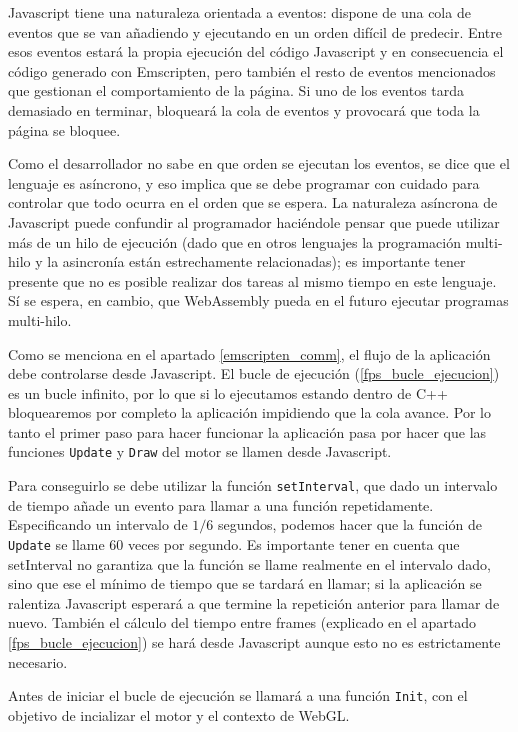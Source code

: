 Javascript tiene una naturaleza orientada a eventos: dispone de una cola de eventos que se van añadiendo y ejecutando en un orden difícil de predecir. Entre esos eventos estará la propia ejecución del código Javascript y en consecuencia el código generado con Emscripten, pero también el resto de eventos mencionados que gestionan el comportamiento de la página. Si uno de los eventos tarda demasiado en terminar, bloqueará la cola de eventos y provocará que toda la página se bloquee.

Como el desarrollador no sabe en que orden se ejecutan los eventos, se dice que el lenguaje es asíncrono, y eso implica que se debe programar con cuidado para controlar que todo ocurra en el orden que se espera. La naturaleza asíncrona de Javascript puede confundir al programador haciéndole pensar que puede utilizar más de un hilo de ejecución (dado que en otros lenguajes la programación multi-hilo y la asincronía están estrechamente relacionadas); es importante tener presente que no es posible realizar dos tareas al mismo tiempo en este lenguaje. Sí se espera, en cambio, que WebAssembly pueda en el futuro ejecutar programas multi-hilo.

Como se menciona en el apartado \ref{emscripten_comm}, el flujo de la aplicación debe controlarse desde Javascript. El bucle de ejecución (\ref{fps_bucle_ejecucion}) es un bucle infinito, por lo que si lo ejecutamos estando dentro de C++ bloquearemos por completo la aplicación impidiendo que la cola avance. Por lo tanto el primer paso para hacer funcionar la aplicación pasa por hacer que las funciones \texttt{Update} y \texttt{Draw} del motor se llamen desde Javascript.

Para conseguirlo se debe utilizar la función \texttt{setInterval}, que dado un intervalo de tiempo añade un evento para llamar a una función repetidamente. Especificando un intervalo de $1/6$ segundos, podemos hacer que la función de \texttt{Update} se llame 60 veces por segundo. Es importante tener en cuenta que setInterval no garantiza que la función se llame realmente en el intervalo dado, sino que ese el mínimo de tiempo que se tardará en llamar; si la aplicación se ralentiza Javascript esperará a que termine la repetición anterior para llamar de nuevo. También el cálculo del tiempo entre frames (explicado en el apartado \ref{fps_bucle_ejecucion}) se hará desde Javascript aunque esto no es estrictamente necesario.

Antes de iniciar el bucle de ejecución se llamará a una función \texttt{Init}, con el objetivo de incializar el motor y el contexto de WebGL.

